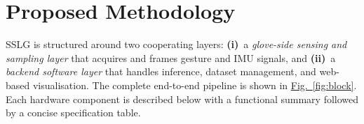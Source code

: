 \documentclass[conference]{IEEEtran}
\newcommand{\FigLink}[1]{\hyperref[#1]{Fig.~\ref*{#1}}}
\newcommand{\SystemAcronym}{SSLG }
\begin{document}
\section{Proposed Methodology}
\label{sec:methodology}

\SystemAcronym is structured around two cooperating layers:
\textbf{(i)}~a \emph{glove-side sensing and sampling layer} that acquires and
frames gesture and IMU signals, and
\textbf{(ii)}~a \emph{backend software layer} that handles inference, dataset
management, and web-based visualisation.
The complete end-to-end pipeline is shown in \FigLink{fig:block}.
Each hardware component is described below with a functional summary followed
by a concise specification table.
\end{document}

